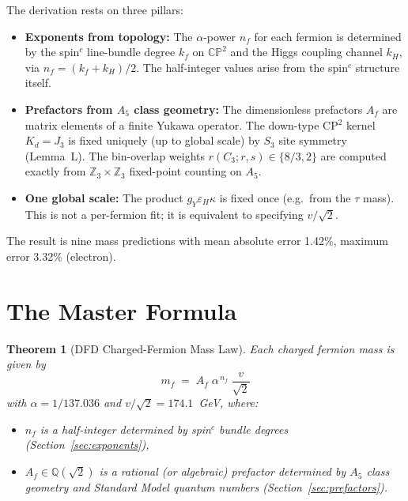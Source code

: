 \documentclass[11pt,a4paper]{article}
\newcommand{\CP}{\mathbb{CP}}
\newtheorem{theorem}{Theorem}
\begin{document}
The derivation rests on three pillars:
\begin{itemize}
\item \textbf{Exponents from topology:} The $\alpha$-power $n_f$ for each fermion
is determined by the spin$^c$ line-bundle degree $k_f$ on $\CP^2$ and the Higgs
coupling channel $k_H$, via $n_f = (k_f + k_H)/2$.  The half-integer values
arise from the spin$^c$ structure itself.
\item \textbf{Prefactors from $A_5$ class geometry:} The dimensionless
prefactors $A_f$ are matrix elements of a finite Yukawa operator.  The
down-type CP$^2$ kernel $K_d = J_3$ is fixed uniquely (up to global scale) by
$S_3$ site symmetry (Lemma~L).  The bin-overlap weights $r(C_3;r,s)\in\{8/3,2\}$
are computed exactly from $\mathbb{Z}_3\times\mathbb{Z}_3$ fixed-point counting
on $A_5$.
\item \textbf{One global scale:} The product $g_Y\varepsilon_H\kappa$ is fixed
once (e.g.\ from the $\tau$ mass).  This is not a per-fermion fit; it is
equivalent to specifying $v/\sqrt{2}$.
\end{itemize}

The result is nine mass predictions with mean absolute error 1.42\%, maximum
error 3.32\% (electron).


\section{The Master Formula}
\label{sec:master}

\begin{theorem}[DFD Charged-Fermion Mass Law]
\label{thm:mass-law}
Each charged fermion mass is given by
\begin{equation}
\boxed{\quad m_f \;=\; A_f\;\alpha^{\,n_f}\;\frac{v}{\sqrt{2}}\quad}
\label{eq:master}
\end{equation}
with $\alpha = 1/137.036$ and $v/\sqrt{2} = 174.1$~GeV, where:
\begin{itemize}
\item $n_f$ is a half-integer determined by spin$^c$ bundle degrees (Section~\ref{sec:exponents}),
\item $A_f\in\mathbb{Q}(\sqrt{2})$ is a rational (or algebraic) prefactor determined by
$A_5$ class geometry and Standard Model quantum numbers (Section~\ref{sec:prefactors}).
\end{itemize}
\end{theorem}
\end{document}
